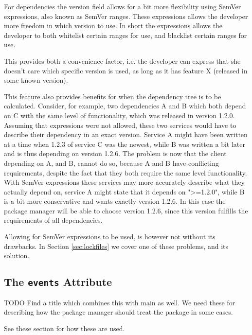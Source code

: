 
For dependencies the version field allows for a bit more flexibility using
SemVer expressions, also known as SemVer ranges. These expressions allows the
developer more freedom in which version to use. In short the expressions allows
the developer to both whitelist certain ranges for use, and blacklist certain
ranges for use.

This provides both a convenience factor, i.e. the developer can express that
she doesn't care which specific version is used, as long as it has feature X
(released in some known version).

This feature also provides benefits for when the dependency tree is to be
calculated. Consider, for example, two dependencies A and B which both depend
on C with the same level of functionality, which was released in version 1.2.0.
Assuming that expressions were not allowed, these two services would have to
describe their dependency in an exact version. Service A might have been
written at a time when 1.2.3 of service C was the newest, while B was written a
bit later and is thus depending on version 1.2.6. The problem is now that the
client depending on A, and B, cannot do so, because A and B have conflicting
requirements, despite the fact that they both require the same level
functionality. With SemVer expressions these services may more accurately
describe what they actually depend on, service A might state that it depends on
">=1.2.0", while B is a bit more conservative and wants exactly version 1.2.6.
In this case the package manager will be able to choose version 1.2.6, since
this version fulfills the requirements of all dependencies.

Allowing for SemVer expressions to be used, is however not without its
drawbacks. In Section \ref{sec:lockfiles} we cover one of these problems, and
its solution.

\subsection{The {\tt events} Attribute}

TODO Find a title which combines this with main as well. We need these for
describing how the package manager should treat the package in some cases.

See these section for how these are used.
